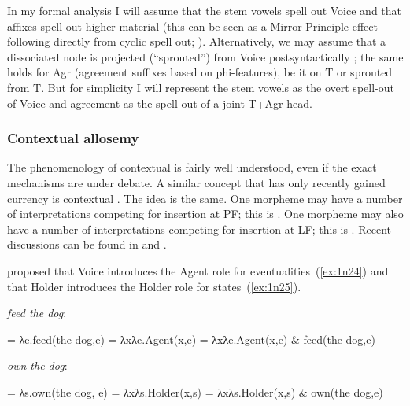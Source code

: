\begin{exe}
\begin{xlist}
\begin{exe}
\begin{exe}
\begin{exe}
\begin{exe}
\begin{xlist}
\begin{exe}
\begin{xlist}
\begin{xlist}
\begin{xlist}
\begin{exe}
\begin{xlist}
\begin{exe}
\begin{exe}
\begin{xlist}
\begin{exe}
\begin{xlist}
\begin{exe}
\begin{exe}
\begin{xlist}
\begin{exe}
\begin{xlist}
\begin{exe}
\begin{xlist}
\begin{exe}
\begin{exe}
\begin{xlist}
\begin{exe}
\begin{exe}
\begin{xlist}
\begin{exe}
\begin{xlist}
In my formal analysis I will assume that the stem vowels spell out Voice and that affixes spell out higher material (this can be seen as a Mirror Principle effect following directly from cyclic spell out; \citealt{baker85,muysken88,katie13,zukoff16nels,kastner18nllt}). Alternatively, we may assume that a dissociated  node is projected (``sprouted'') from Voice postsyntactically \citep{oltramassuet99,embick10}; the same holds for Agr (agreement suffixes based on phi-features), be it on T or sprouted from T. But for simplicity I will represent the stem vowels as the overt spell-out of Voice and agreement as the spell out of a joint T+Agr head.

		\subsubsection{Contextual allosemy}
The phenomenology of contextual  is fairly well understood, even if the exact mechanisms are under debate. A similar concept that has only recently gained currency is contextual \emph{}. The idea is the same. One morpheme may have a number of interpretations competing for insertion at PF; this is . One morpheme may also have a number of interpretations competing for insertion at LF; this is . Recent discussions can be found in \cite{woodmarantz17} and \cite{mylermarantz19cup}.

\cite{kratzer96} proposed that Voice introduces the Agent role for eventualities~(\ref{ex:1n24}) and that Holder introduces the Holder role for states~(\ref{ex:1n25}).
 \begin{exe}
 \ex  \emph{feed the dog}: \label{ex:1n24}
 \begin{xlist} 
 	\ex  {} = λe.feed(the dog,e) 
 	\ex  {} = λxλe.Agent(x,e) 
 	\ex  {} = λxλe.Agent(x,e) \& feed(the dog,e) 
 \z

 \ex  \emph{own the dog}: \label{ex:1n25}
 \begin{xlist} 
 	\ex  {} = λs.own(the dog, e) 
 	\ex  {} = λxλs.Holder(x,s) 
 	\ex  {} = λxλs.Holder(x,s) \& own(the dog,e) 
 \z
\z 


\end{xlist}
\end{xlist}
\end{exe}
\end{xlist}
\end{exe}
\end{xlist}
\end{exe}
\end{exe}
\end{xlist}
\end{exe}
\end{exe}
\end{xlist}
\end{exe}
\end{xlist}
\end{exe}
\end{xlist}
\end{exe}
\end{exe}
\end{xlist}
\end{exe}
\end{xlist}
\end{exe}
\end{exe}
\end{xlist}
\end{exe}
\end{xlist}
\end{xlist}
\end{xlist}
\end{exe}
\end{xlist}
\end{exe}
\end{exe}
\end{exe}
\end{exe}
\end{xlist}
\end{exe}
